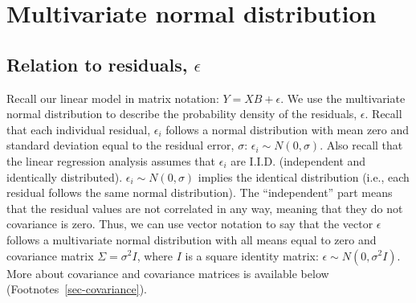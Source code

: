 \documentclass[
  letterpaper,
  DIV=11,
  numbers=noendperiod]{scrreprt}
\begin{document}
\begin{figure}

\begin{minipage}[t]{0.50\linewidth}

{\centering 


}

\end{minipage}%
%
\begin{minipage}[t]{0.50\linewidth}

{\centering 


}

\end{minipage}%

\end{figure}

\hypertarget{multivariate-normal-distribution}{%
\section{Multivariate normal
distribution}\label{multivariate-normal-distribution}}

\hypertarget{relation-to-residuals-epsilon}{%
\subsection{\texorpdfstring{Relation to residuals,
\(\epsilon\)}{Relation to residuals, \textbackslash epsilon}}\label{relation-to-residuals-epsilon}}

Recall our linear model in matrix notation: \(Y = XB + \epsilon\). We
use the multivariate normal distribution to describe the probability
density of the residuals, \(\epsilon\). Recall that each individual
residual, \(\epsilon_i\) follows a normal distribution with mean zero
and standard deviation equal to the residual error, \(\sigma\):
\(\epsilon_i \sim N(0, \sigma)\). Also recall that the linear regression
analysis assumes that \(\epsilon_i\) are I.I.D. (independent and
identically distributed). \(\epsilon_i \sim N(0, \sigma)\) implies the
identical distribution (i.e., each residual follows the same normal
distribution). The ``independent'' part means that the residual values
are not correlated in any way, meaning that they do not covariance is
zero. Thus, we can use vector notation to say that the vector
\(\epsilon\) follows a multivariate normal distribution with all means
equal to zero and covariance matrix \(\Sigma = \sigma^2 I\), where \(I\)
is a square identity matrix: \(\epsilon \sim N(0, \sigma^2 I)\). More
about covariance and covariance matrices is available below
(Footnotes~\ref{sec-covariance}).
\end{document}
